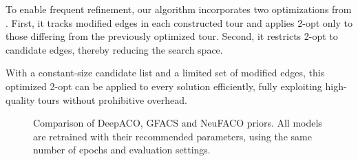 \documentclass[a4paper,conference]{IEEEtran}
\begin{document}
To enable frequent refinement, our algorithm incorporates two optimizations from \cite{FACO2023}. First, it tracks modified edges in each constructed tour and applies 2-opt only to those differing from the previously optimized tour. Second, it restricts 2-opt to candidate edges, thereby reducing the search space.

With a constant-size candidate list and a limited set of modified edges, this optimized 2-opt can be applied to every solution efficiently, fully exploiting high-quality tours without prohibitive overhead.

\begin{figure}[!htb]
  \centering


  \caption{Comparison of DeepACO, GFACS and NeuFACO priors. All models are retrained with their recommended parameters, using the same number of epochs and evaluation settings.}
  \label{fig:NAR}
\end{figure}
\end{document}
